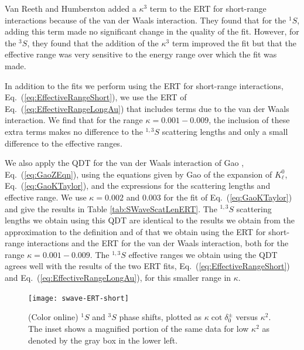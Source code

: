 \documentclass[preprint,showpacs,showkeys,preprintnumbers,amsmath,amssymb,longbibliography,pra,aps]{revtex4-1}
\begin{document}
Van Reeth and Humberston \cite{VanReeth2003} added a $\kappa^3$ term to the
ERT for short-range interactions because of the van der Waals interaction.
They found that for the $^1S$, adding this term made no significant change in the
quality of the fit. However, for the $^3S$, they found that the addition of
the $\kappa^3$ term improved the fit but that the effective range was very sensitive
to the energy range over which the fit was made.

In addition to the fits we perform using the ERT for short-range interactions,
Eq.~(\ref{eq:EffectiveRangeShort}), we use the ERT of Eq.~(\ref{eq:EffectiveRangeLongAu})
that includes terms due to the van der Waals interaction. We find
that for the range $\kappa = 0.001 - 0.009$, the inclusion of these extra terms
makes no difference to the $^{1,3}S$ scattering lengths and only a
small difference to the effective ranges.

We also apply the QDT for the van der Waals interaction of Gao
\cite{Gao1998}, Eq.~(\ref{eq:GaoZEqn}), using the equations given by
Gao \cite{Gao1998a} of the expansion of $K_\ell^0$, Eq.~(\ref{eq:GaoKTaylor}),
and the expressions for the scattering lengths and effective range. We use
$\kappa = 0.002$ and $0.003$ for the fit of Eq.~(\ref{eq:GaoKTaylor}) and 
give the results in Table \ref{tab:SWaveScatLenERT}. The $^{1,3}S$
scattering lengths we obtain using this QDT are
identical to the results we obtain from the approximation to the definition
and of that we obtain using the ERT for short-range 
interactions and the ERT for the van der Waals interaction, both for the
range $\kappa = 0.001 - 0.009$. The $^{1,3}S$ effective ranges we obtain using
the QDT agrees well with the results of the two ERT fits,
Eq.~(\ref{eq:EffectiveRangeShort}) and Eq.~(\ref{eq:EffectiveRangeLongAu}),
for this smaller range in $\kappa$.

\begin{figure}[H]
	\centering
	\texttt{[image: swave-ERT-short]}
	\caption{(Color online) $^1S$ and $^3S$ phase shifts, plotted as
$\kappa \cot \delta_0^\pm$ versus $\kappa^2$. The inset shows a magnified
portion of the same data for low $\kappa^2$ as denoted by the gray box in the lower left.}
	\label{fig:swave-ERT-short}
\end{figure}
\end{document}
